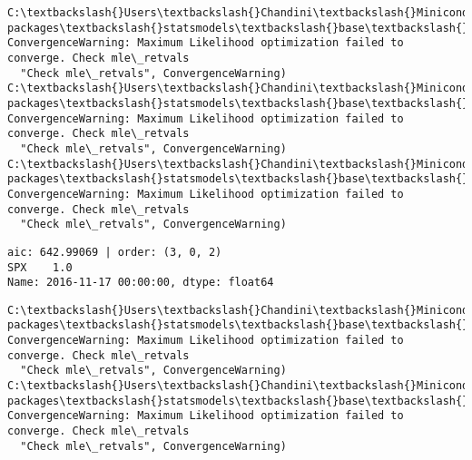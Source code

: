 \documentclass[11pt]{article}
\begin{document}
    \begin{Verbatim}[commandchars=\\\{\}]
C:\textbackslash{}Users\textbackslash{}Chandini\textbackslash{}Miniconda3\textbackslash{}envs\textbackslash{}auquan\textbackslash{}lib\textbackslash{}site-packages\textbackslash{}statsmodels\textbackslash{}base\textbackslash{}model.py:496: ConvergenceWarning: Maximum Likelihood optimization failed to converge. Check mle\_retvals
  "Check mle\_retvals", ConvergenceWarning)
C:\textbackslash{}Users\textbackslash{}Chandini\textbackslash{}Miniconda3\textbackslash{}envs\textbackslash{}auquan\textbackslash{}lib\textbackslash{}site-packages\textbackslash{}statsmodels\textbackslash{}base\textbackslash{}model.py:496: ConvergenceWarning: Maximum Likelihood optimization failed to converge. Check mle\_retvals
  "Check mle\_retvals", ConvergenceWarning)
C:\textbackslash{}Users\textbackslash{}Chandini\textbackslash{}Miniconda3\textbackslash{}envs\textbackslash{}auquan\textbackslash{}lib\textbackslash{}site-packages\textbackslash{}statsmodels\textbackslash{}base\textbackslash{}model.py:496: ConvergenceWarning: Maximum Likelihood optimization failed to converge. Check mle\_retvals
  "Check mle\_retvals", ConvergenceWarning)

    \end{Verbatim}

    \begin{Verbatim}[commandchars=\\\{\}]
aic: 642.99069 | order: (3, 0, 2)
SPX    1.0
Name: 2016-11-17 00:00:00, dtype: float64

    \end{Verbatim}

    \begin{Verbatim}[commandchars=\\\{\}]
C:\textbackslash{}Users\textbackslash{}Chandini\textbackslash{}Miniconda3\textbackslash{}envs\textbackslash{}auquan\textbackslash{}lib\textbackslash{}site-packages\textbackslash{}statsmodels\textbackslash{}base\textbackslash{}model.py:496: ConvergenceWarning: Maximum Likelihood optimization failed to converge. Check mle\_retvals
  "Check mle\_retvals", ConvergenceWarning)
C:\textbackslash{}Users\textbackslash{}Chandini\textbackslash{}Miniconda3\textbackslash{}envs\textbackslash{}auquan\textbackslash{}lib\textbackslash{}site-packages\textbackslash{}statsmodels\textbackslash{}base\textbackslash{}model.py:496: ConvergenceWarning: Maximum Likelihood optimization failed to converge. Check mle\_retvals
  "Check mle\_retvals", ConvergenceWarning)

    \end{Verbatim}
\end{document}
